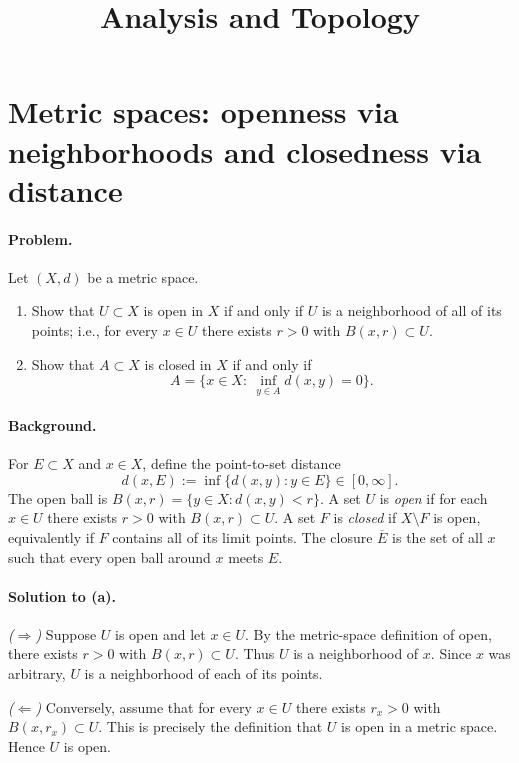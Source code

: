\documentclass[12pt,a4paper]{article}
\title{\Large Analysis and Topology}
\author{}
\date{}
\begin{document}
	\maketitle
	
	\section*{Metric spaces: openness via neighborhoods and closedness via distance}
	
	\paragraph{Problem.}
	Let $(X,d)$ be a metric space.
	\begin{enumerate}[label=(\alph*)] %
		\item Show that $U\subset X$ is open in $X$ if and only if $U$ is a neighborhood of all of its points; i.e., for every $x\in U$ there exists $r>0$ with $B(x,r)\subset U$.
		\item Show that $A\subset X$ is closed in $X$ if and only if
		\[
		A=\{x\in X:\ \inf_{y\in A} d(x,y)=0\}.
		\]
	\end{enumerate}
	
	\paragraph{Background.}
	For $E\subset X$ and $x\in X$, define the point-to-set distance
	\[
	d(x,E):=\inf\{d(x,y):y\in E\}\in[0,\infty].
	\]
	The open ball is $B(x,r)=\{y\in X: d(x,y)<r\}$. A set $U$ is \emph{open} if for each $x\in U$ there exists $r>0$ with $B(x,r)\subset U$. A set $F$ is \emph{closed} if $X\setminus F$ is open, equivalently if $F$ contains all of its limit points. The closure $\overline{E}$ is the set of all $x$ such that every open ball around $x$ meets $E$.
	
	\bigskip
	
	\paragraph{Solution to (a).}
	\emph{($\Rightarrow$)} Suppose $U$ is open and let $x\in U$. By the metric-space definition of open, there exists $r>0$ with $B(x,r)\subset U$. Thus $U$ is a neighborhood of $x$. Since $x$ was arbitrary, $U$ is a neighborhood of each of its points.
	
	\smallskip
	\noindent
	\emph{($\Leftarrow$)} Conversely, assume that for every $x\in U$ there exists $r_x>0$ with $B(x,r_x)\subset U$. This is precisely the definition that $U$ is open in a metric space. Hence $U$ is open.
	
\end{document}
